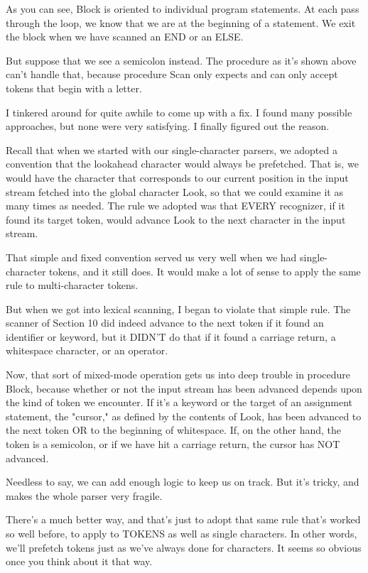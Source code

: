 As  you   can  see, Block  is  oriented  to  individual  program statements. At each pass through  the  loop, we know that we are at  the beginning of a statement. We exit the block when we have scanned an END or an ELSE.

But suppose that we see a semicolon instead. The  procedure  as it's shown above  can't  handle that, because procedure Scan only expects and can only accept tokens that begin with a letter.

I  tinkered  around for quite awhile to come up with a  fix. I found many possible approaches, but none were very satisfying. I finally figured out the reason.

Recall that when we started with our single-character parsers, we adopted a convention that the lookahead character would always be prefetched. That   is, we  would  have  the  character  that corresponds to our  current  position in the input stream fetched into the global character Look, so that we could  examine  it  as many  times  as  needed. The  rule  we  adopted was that EVERY recognizer, if it found its target token, would  advance  Look to the next character in the input stream.

That simple and fixed convention served us very well when  we had single-character tokens, and it still does. It would make  a lot of sense to apply the same rule to multi-character tokens.

But when we got into lexical scanning, I began  to  violate  that simple rule. The scanner of  Section 10  did  indeed  advance  to the next token if it found an identifier or keyword, but it DIDN'T do that if it found a carriage return, a whitespace character, or an operator.

Now, that sort of mixed-mode  operation gets us into deep trouble in procedure Block, because whether or not the  input  stream has been advanced depends upon the kind of token we  encounter. If it's  a keyword or the target of  an  assignment  statement, the "cursor," as defined by the contents of Look, has  been advanced to  the next token OR to the beginning of whitespace. If, on the other  hand, the  token  is  a  semicolon, or if we have hit  a carriage return, the cursor has NOT advanced.

Needless to say, we can add enough logic  to  keep  us  on track. But it's tricky, and makes the whole parser very fragile.

There's a much  better  way, and  that's just to adopt that same rule that's worked so well before, to apply to TOKENS as  well as single characters. In other words, we'll prefetch tokens just as we've always done for  characters. It seems so obvious once you think about it that way.


